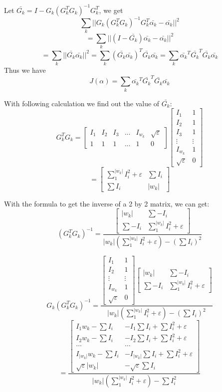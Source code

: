 \documentclass[11pt,letterpaper]{article}
\begin{document}
Let $\bar{G_k} = I - G_k(G_k^T G_k)^{-1}G_k^T$, we get
$$\sum_{k}||G_k(G_k^TG_k)^{-1}G_k^T \bar{\alpha_k} - \bar{\alpha_k}||^2$$
$$ = \sum_{k}|| (I - \bar{G_k})\bar{\alpha_k} - \bar{\alpha_k}||^2 $$
$$ = \sum_{k}|| \bar{G_k}\bar{\alpha_k}||^2 = \sum_{k} (\bar{G_k}\bar{\alpha_k})^T \bar{G_k}\bar{\alpha_k} = \sum_{k} \bar{\alpha_k}^T\bar{G_k}^T \bar{G_k}\bar{\alpha_k}$$
Thus we have
$$J(\alpha) = \sum_{k} \bar{\alpha_k}^T\bar{G_k}^T \bar{G_k}\bar{\alpha_k}$$

With following calculation we find out the value of $\bar{G_k}$: 
$$G_k^TG_k = \begin{bmatrix}
    I_1 & I_2 & I_3 & ... & I_{w_k} & \sqrt{\varepsilon}\\
    1 & 1 & 1 & ... & 1 & 0 
  \end{bmatrix}
  \begin{bmatrix}
    I_1 & 1 \\ I_2 & 1 \\ I_3 & 1 \\ \vdots & \vdots \\ I_{w_k} & 1 \\ \sqrt{\varepsilon} & 0 
  \end{bmatrix} $$
$$ = \begin{bmatrix}
    \sum_{1}^{|w_k|} I_i^2 + \varepsilon & \sum I_i \\
    \sum I_i & |w_k|
  \end{bmatrix}$$

With the formula to get the inverse of a 2 by 2 matrix, we can get: 
$$(G_k^TG_k)^{-1} = \frac{\begin{bmatrix}
    |w_k| & \sum -I_i \\
    \sum -I_i & \sum_{1}^{|w_k|} I_i^2 + \varepsilon
  \end{bmatrix}}{|w_k|(\sum_{1}^{|w_k|} I_i^2 + \varepsilon) - (\sum I_i)^2} 
  $$

$$G_k(G_k^TG_k)^{-1} = \frac{\begin{bmatrix}
    I_1 & 1 \\ I_2 & 1 \\ \vdots & \vdots \\ I_{w_k} & 1 \\ \sqrt{\varepsilon} & 0 
  \end{bmatrix} 
  \begin{bmatrix}
    |w_k| & \sum -I_i \\
    \sum -I_i & \sum_{1}^{|w_k|} I_i^2 + \varepsilon
  \end{bmatrix}}{|w_k|(\sum_{1}^{|w_k|} I_i^2 + \varepsilon) - (\sum I_i)^2} $$
$$ = \frac{\begin{bmatrix}
    I_1w_k - \sum I_i & -I_1 \sum I_i + \sum I_i^2 + \varepsilon \\
    I_2w_k - \sum I_i & -I_2 \sum I_i + \sum I_i^2 + \varepsilon \\
    \hdots & \hdots \\
    I_{|w_k|}w_k - \sum I_i & -I_{|w_k|} \sum I_i + \sum I_i^2 + \varepsilon \\
    \sqrt{\varepsilon}|w_k| & -\sqrt{\varepsilon}\sum I_i
  \end{bmatrix}}{|w_k|(\sum_{1}^{|w_k|} I_i^2 + \varepsilon) - \sum I_i^2}$$
\end{document}
